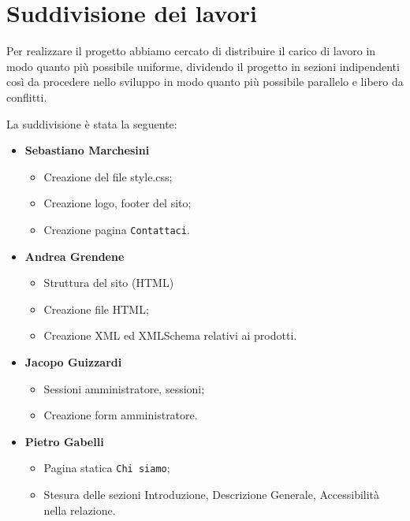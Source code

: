 \section{Suddivisione dei lavori}{
	Per realizzare il progetto abbiamo cercato di distribuire il carico di lavoro in modo quanto più possibile uniforme, dividendo il progetto in sezioni indipendenti così da procedere nello sviluppo in modo quanto più possibile parallelo e libero da conflitti.
	
	La suddivisione è stata la seguente: 	
	\begin{itemize}\itemsep1pt
		\item \textbf{Sebastiano Marchesini} 
		\begin{itemize}\itemsep1pt
			\item Creazione del file style.css;
			\item Creazione logo, footer del sito;
			\item Creazione pagina \texttt{Contattaci}.
		\end{itemize}
		\item \textbf{Andrea Grendene}
		\begin{itemize}\itemsep1pt
			\item Struttura del sito (HTML)
			\item Creazione file HTML;
			\item Creazione XML ed XMLSchema relativi ai prodotti.
		\end{itemize}
		\item \textbf{Jacopo Guizzardi}
		\begin{itemize}\itemsep1pt
			\item Sessioni amministratore, sessioni;
			\item Creazione form amministratore.
		\end{itemize}
		\item \textbf{Pietro Gabelli}
		\begin{itemize}\itemsep1pt
			\item Pagina statica \texttt{Chi siamo};
			\item Stesura delle sezioni Introduzione, Descrizione Generale, Accessibilità nella relazione.
		\end{itemize}
	\end{itemize}
}